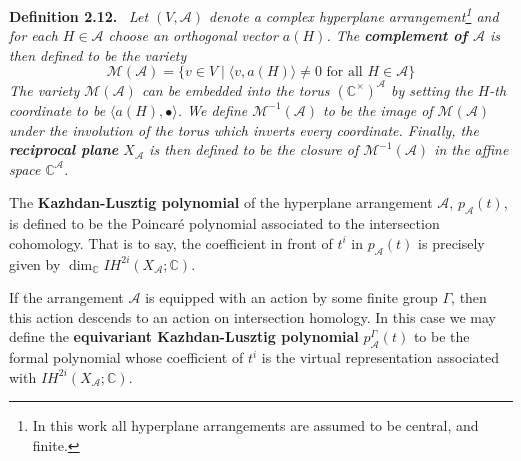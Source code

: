 \documentclass[10pt,a4paper]{article}
\newenvironment{sourceblock}[1]{\par\medskip\noindent\textbf{#1.}\ \itshape}{\par\medskip}
\begin{document}
\begin{sourceblock}{Definition 2.12}
Let $(V,\mathcal{A})$ denote a complex hyperplane arrangement\footnote{In this work all hyperplane arrangements are assumed to be central, and finite.} and for each $H\in\mathcal{A}$ choose an orthogonal vector $a(H)$. The \textbf{complement of $\mathcal{A}$} is then defined to be the variety
\[
 \mathcal{M}(\mathcal{A})=\{v\in V\mid\langle v,a(H)\rangle\neq0\text{ for all }H\in\mathcal{A}\}
\]
The variety $\mathcal{M}(\mathcal{A})$ can be embedded into the torus $(\mathbb{C}^\times)^{\mathcal{A}}$ by setting the $H$-th coordinate to be $\langle a(H),\bullet\rangle$. We define $\mathcal{M}^{-1}(\mathcal{A})$ to be the image of $\mathcal{M}(\mathcal{A})$ under the involution of the torus which inverts every coordinate. Finally, the \textbf{reciprocal plane} $X_{\mathcal{A}}$ is then defined to be the closure of $\mathcal{M}^{-1}(\mathcal{A})$ in the affine space $\mathbb{C}^{\mathcal{A}}$.

The \textbf{Kazhdan-Lusztig polynomial} of the hyperplane arrangement $\mathcal{A}$, $p_{\mathcal{A}}(t)$, is defined to be the Poincar\'e polynomial associated to the intersection cohomology. That is to say, the coefficient in front of $t^i$ in $p_{\mathcal{A}}(t)$ is precisely given by $\dim_{\mathbb{C}}IH^{2i}(X_{\mathcal{A}};\mathbb{C})$.

If the arrangement $\mathcal{A}$ is equipped with an action by some finite group $\Gamma$, then this action descends to an action on intersection homology. In this case we may define the \textbf{equivariant Kazhdan-Lusztig polynomial} $p_{\mathcal{A}}^\Gamma(t)$ to be the formal polynomial whose coefficient of $t^i$ is the virtual representation associated with $IH^{2i}(X_{\mathcal{A}};\mathbb{C})$.
\end{sourceblock}
\end{document}
